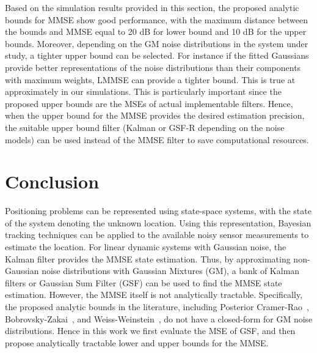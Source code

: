 \documentclass[10pt,twocolumn,twoside]{IEEEtran}
\newcommand{\corcol}[1]{\textcolor{CorCol}{#1}}
\begin{document}
Based on the simulation results provided in this section, the proposed analytic bounds for MMSE show good performance, with the maximum distance between the bounds and MMSE equal to 20 dB for lower bound and 10 dB for the upper bounds. Moreover, depending on the GM noise distributions in the system under study, a tighter upper bound can be selected. \corcol{For instance if the fitted Gaussians provide better representations of the noise distributions than their components with  maximum weights, LMMSE can provide a tighter bound. This is true at approximately  in our simulations.} This is particularly important since the proposed upper bounds are the MSEs of actual implementable filters. Hence, when the upper bound for the MMSE provides the desired estimation precision, the suitable upper bound filter (Kalman or GSF-R depending on the noise models) can be used instead of the MMSE filter to save computational resources.  
\section{Conclusion}
\label{sec:Conclusion}
Positioning problems can be represented using state-space systems, with the state of the system denoting the unknown location. Using this representation, Bayesian tracking techniques can be applied to the available noisy sensor measurements to estimate the location. For linear dynamic systems with Gaussian noise, \corcol{the }Kalman filter provides the MMSE state estimation. Thus, by approximating non-Gaussian  noise distributions with Gaussian Mixtures (GM), a bank of Kalman filters or Gaussian Sum Filter (GSF) can be used to find the MMSE state estimation. However, the MMSE itself is not analytically tractable. Specifically, the proposed analytic bounds in the literature, including Posterior Cramer-Rao~\cite{tichavsky_posterior_1998}, Bobrovsky-Zakai~\cite{bobrovsky_lower_1976}, and Weiss-Weinstein~\cite{weiss_lower_1985,xaver_analytic_2013}, do not have a closed-form for GM noise distributions. Hence in this work we first evaluate the MSE of GSF, and then propose analytically tractable lower and upper bounds for the MMSE.
\end{document}
